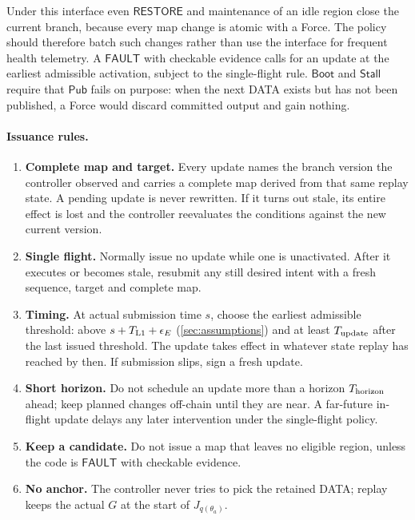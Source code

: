 \documentclass[11pt,a4paper]{article}
\newcommand{\tagg}[1]{\ensuremath{\mathsf{#1}}}
\begin{document}
Under this interface even \tagg{RESTORE} and maintenance of an idle
region close the current branch, because every map change is atomic with
a Force. The policy should therefore batch such changes rather than use
the interface for frequent health telemetry. A \tagg{FAULT} with
checkable evidence calls for an update at the earliest admissible
activation, subject to the single-flight rule. $\tagg{Boot}$ and
$\tagg{Stall}$ require that $\tagg{Pub}$ fails on purpose: when the next
DATA exists but has not been published, a Force would discard committed
output and gain nothing.

\paragraph{Issuance rules.}
\begin{enumerate}[label=(R\arabic*)]
\item \textbf{Complete map and target.} Every update names the branch
version the controller observed and carries a complete map derived from
that same replay state. A pending update is never rewritten. If it turns
out stale, its entire effect is lost and the controller reevaluates the
conditions against the new current version.
\item \textbf{Single flight.} Normally issue no update while one is
unactivated. After it executes or becomes stale, resubmit any still
desired intent with a fresh sequence, target and complete map.
\item \textbf{Timing.} At actual submission time $s$, choose the
earliest admissible threshold: above $s+T_{\rm L1}+\epsilon_E$
(\cref{sec:assumptions}) and at least $T_{\rm update}$ after the last
issued threshold. The update takes effect in whatever state replay has
reached by then. If submission slips, sign a fresh update.
\item \textbf{Short horizon.} Do not schedule an update more than a
horizon $T_{\rm horizon}$ ahead; keep planned changes off-chain until they are near.
A far-future in-flight update delays any later intervention under the
single-flight policy.
\item \textbf{Keep a candidate.} Do not issue a map that leaves no
eligible region, unless the code is \tagg{FAULT} with checkable
evidence.
\item \textbf{No anchor.} The controller never tries to pick the
retained DATA; replay keeps the actual $G$ at the start of
$J_{q(\theta_a)}$.
\end{enumerate}
\end{document}
